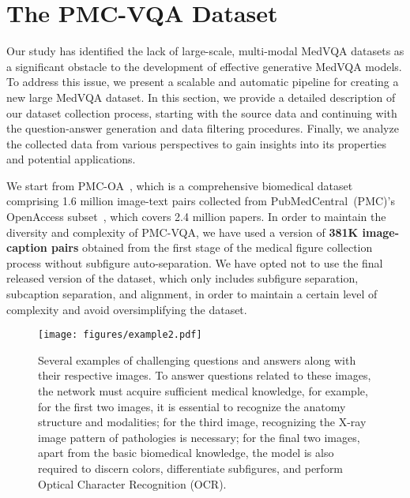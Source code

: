 \documentclass{article}
\begin{document}
 
\vspace{-0.2cm}
\section{The PMC-VQA Dataset}
Our study has identified the lack of large-scale, multi-modal MedVQA datasets as a significant obstacle to the development of effective generative MedVQA models. To address this issue, we present a scalable and automatic pipeline for creating a new large  MedVQA dataset. 
In this section, we provide a detailed description of our dataset collection process, starting with the source data and continuing with the question-answer generation and data filtering procedures. 
Finally, we analyze the collected data from various perspectives to gain insights into its properties and potential applications.




We start from PMC-OA~\cite{lin2023pmcclip}, which is a comprehensive biomedical dataset comprising 1.6 million image-text pairs collected from PubMedCentral~(PMC)'s OpenAccess subset~\cite{roberts2001pubmed}, which covers 2.4 million papers. 
In order to maintain the diversity and complexity of PMC-VQA, 
we have used a version of \textbf{381K image-caption pairs} obtained from the first stage of the medical figure collection process without subfigure auto-separation. 
We have opted not to use the final released version of the dataset, 
which only includes subfigure separation, subcaption separation, and alignment, in order to maintain a certain level of complexity and avoid oversimplifying the dataset. 



\begin{figure}[!tb]
    \centering
    \texttt{[image: figures/example2.pdf]}
    \caption{
    Several examples of challenging questions and answers along with their respective images. 
    To answer questions related to these images, 
    the network must acquire sufficient medical knowledge, 
    for example, for the first two images, it is essential to recognize the anatomy structure and modalities;
    for the third image, recognizing the X-ray image pattern of pathologies is necessary;
    for the final two images, apart from the basic biomedical knowledge, 
    the model is also required to discern colors, differentiate subfigures, 
    and perform Optical Character Recognition (OCR).
}
    \label{fig:example}
    \vspace{-0.8cm}
\end{figure}
\end{document}
